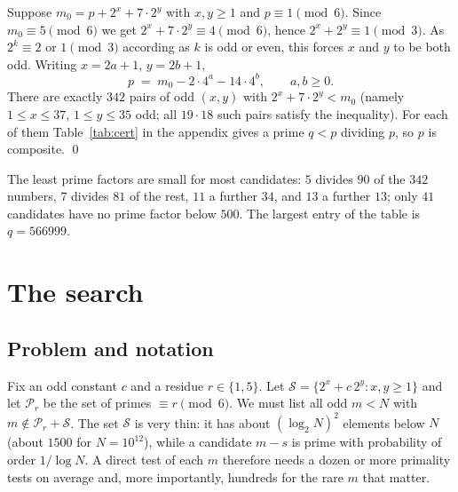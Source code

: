 \documentclass[11pt]{article}
\theoremstyle{definition}
\theoremstyle{remark}
\newcommand{\mz}{m_0}
\begin{document}
Suppose $\mz=p+2^x+7\cdot 2^y$ with $x,y\ge 1$ and $p\equiv 1\pmod 6$. Since $\mz\equiv 5\pmod 6$ we
get $2^x+7\cdot 2^y\equiv 4\pmod 6$, hence $2^x+2^y\equiv 1\pmod 3$. As $2^k\equiv 2$ or $1 \pmod 3$
according as $k$ is odd or even, this forces $x$ and $y$ to be both odd. Writing $x=2a+1$, $y=2b+1$,
\[
  p \;=\; \mz-2\cdot 4^{a}-14\cdot 4^{b},\qquad a,b\ge 0 .
\]
There are exactly $342$ pairs of odd $(x,y)$ with $2^x+7\cdot 2^y<\mz$ (namely $1\le x\le 37$,
$1\le y\le 35$ odd; all $19\cdot 18$ such pairs satisfy the inequality). For each of them
Table~\ref{tab:cert} in the appendix gives a prime $q<p$ dividing $p$, so $p$ is composite. \qed

\medskip
The least prime factors are small for most candidates: $5$ divides $90$ of the $342$ numbers, $7$
divides $81$ of the rest, $11$ a further $34$, and $13$ a further $13$; only $41$ candidates have
no prime factor below $500$. The largest entry of the table is $q=566999$.

\section{The search}\label{sec:algo}

\subsection{Problem and notation}
Fix an odd constant $c$ and a residue $r\in\{1,5\}$. Let
$\mathcal S=\{2^x+c\,2^y: x,y\ge 1\}$ and let $\mathcal P_r$ be the set of primes $\equiv r\pmod 6$.
We must list all odd $m<N$ with $m\notin \mathcal P_r+\mathcal S$. The set $\mathcal S$ is very thin:
it has about $(\log_2 N)^2$ elements below $N$ (about $1500$ for $N=10^{12}$), while a candidate
$m-s$ is prime with probability of order $1/\log N$. A direct test of each $m$ therefore needs a dozen
or more primality tests on average and, more importantly, hundreds for the rare $m$ that matter.
\end{document}

